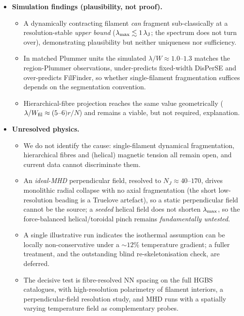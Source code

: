 \documentclass[usenatbib,twoside,twocolumn]{mnras}
\begin{document}
\begin{itemize}
    \item \textbf{Simulation findings (plausibility, not proof).}
    \begin{itemize}
        \item A dynamically contracting filament \emph{can} fragment sub-classically at a resolution-stable \emph{upper bound} ($\lambda_{\rm max}\lesssim1\,\lambda_{\rm J}$; the spectrum does not turn over), demonstrating plausibility but neither uniqueness nor sufficiency.
        \item In matched Plummer units the simulated $\lambda/W\approx1.0$--$1.3$ matches the region-Plummer observations, under-predicts fixed-width DisPerSE and over-predicts FilFinder, so whether single-filament fragmentation suffices depends on the segmentation convention.
        \item Hierarchical-fibre projection reaches the same value geometrically ($\lambda/W_{\rm fil}\approx(5$--$6)r/N$) and remains a viable, but not required, explanation.
    \end{itemize}

    \item \textbf{Unresolved physics.}
    \begin{itemize}
        \item We do not identify the cause: single-filament dynamical fragmentation, hierarchical fibres and (helical) magnetic tension all remain open, and current data cannot discriminate them.
        \item An \emph{ideal-MHD} perpendicular field, resolved to $N_J\approx40$--$170$, drives monolithic radial collapse with no axial fragmentation (the short low-resolution beading is a Truelove artefact), so a static perpendicular field cannot be the source; a \emph{seeded} helical field does not shorten $\lambda_{\rm max}$, so the force-balanced helical/toroidal pinch remains \emph{fundamentally untested}.
        \item A single illustrative run indicates the isothermal assumption can be locally non-conservative under a $\sim12\%$ temperature gradient; a fuller treatment, and the outstanding blind re-skeletonisation check, are deferred.
        \item The decisive test is fibre-resolved NN spacing on the full HGBS catalogues, with high-resolution polarimetry of filament interiors, a perpendicular-field resolution study, and MHD runs with a spatially varying temperature field as complementary probes.
    \end{itemize}
    \end{itemize}
\end{document}
